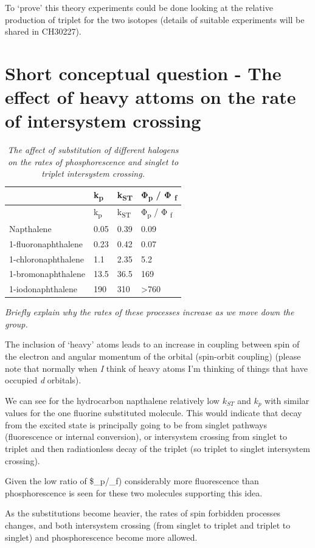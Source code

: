 \documentclass[
]{book}
\begin{document}
To `prove' this theory experiments could be done looking at the relative production of triplet for the two isotopes (details of suitable experiments will be shared in CH30227).

\hypertarget{sec:heavy}{%
\section{Short conceptual question - The effect of heavy attoms on the rate of intersystem crossing}\label{sec:heavy}}

\begin{longtable}[]{@{}llll@{}}
\caption{\label{tab:heavyatom} \emph{The affect of substitution of different halogens on the rates of phosphorescence and singlet to triplet intersystem crossing.}}\tabularnewline
\toprule
& k\textsubscript{p} & k\textsubscript{ST} & Φ\textsubscript{p} / Φ \textsubscript{f}\tabularnewline
\midrule
\endfirsthead
\toprule
& k\textsubscript{p} & k\textsubscript{ST} & Φ\textsubscript{p} / Φ \textsubscript{f}\tabularnewline
\midrule
\endhead
Napthalene & 0.05 & 0.39 & 0.09\tabularnewline
1-fluoronaphthalene & 0.23 & 0.42 & 0.07\tabularnewline
1-chloronaphthalene & 1.1 & 2.35 & 5.2\tabularnewline
1-bromonaphthalene & 13.5 & 36.5 & 169\tabularnewline
1-iodonaphthalene & 190 & 310 & \textgreater760\tabularnewline
\bottomrule
\end{longtable}

\emph{Briefly explain why the rates of these processes increase as we move down the group.}

The inclusion of `heavy' atoms leads to an increase in coupling between spin of the electron and angular momentum of the orbital (spin-orbit coupling) (please note that normally when \emph{I} think of heavy atoms I'm thinking of things that have occupied \emph{d} orbitals).

We can see for the hydrocarbon napthalene relatively low \(k_{ST}\) and \(k_{p}\) with similar values for the one fluorine substituted molecule. This would indicate that decay from the excited state is principally going to be from singlet pathways (fluorescence or internal conversion), or intersystem crossing from singlet to triplet and then radiationless decay of the triplet (so triplet to singlet intersystem crossing).

Given the low ratio of \$\phi\_p/\phi\_f) considerably more fluorescence than phosphorescence is seen for these two molecules supporting this idea.

As the substitutions become heavier, the rates of spin forbidden processes changes, and both intersystem crossing (from singlet to triplet and triplet to singlet) and phosphorescence become more allowed.
\end{document}
